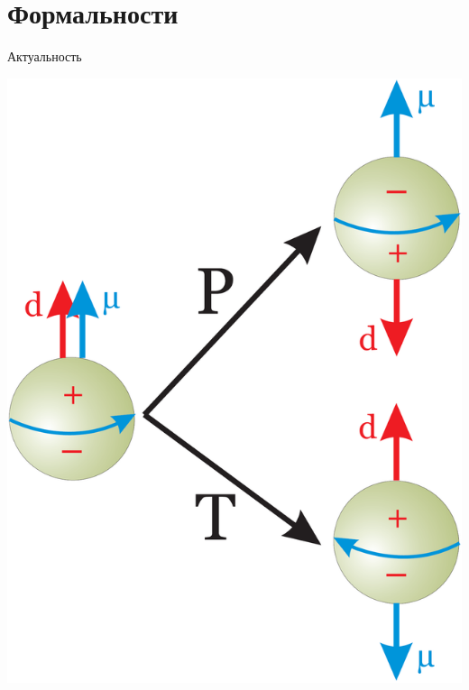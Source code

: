 \documentclass[14pt]{beamer}
\begin{document}
\section{Формальности}
\begin{frame}{Актуальность}
	\begin{center}
		\includegraphics[height=.8\paperheight]{NEDM_P&T_violation}
	\end{center}
\end{frame}
\end{document}
